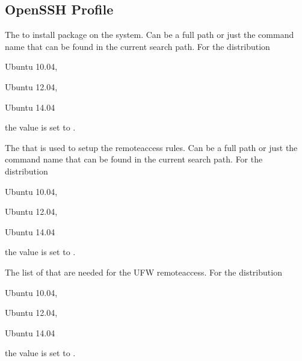 \label{sec:remoteaccess_profile}
\subsection{OpenSSH Profile}


The  to install package on the system. Can be a full path or
just the command name that can be found in the current search path. 
For the distribution
\begin{inparaitem}
\item[\TheDistribution{ubuntu}] Ubuntu 10.04,
\item[\TheDistribution{ubuntu}] Ubuntu 12.04,
\item[\TheDistribution{ubuntu}] Ubuntu 14.04
\end{inparaitem}
the value is set to .


The  that is used to setup the remoteaccess rules. Can be a full path or
just the command name that can be found in the current search path. 
For the distribution
\begin{inparaitem}
\item[\TheDistribution{ubuntu}] Ubuntu 10.04,
\item[\TheDistribution{ubuntu}] Ubuntu 12.04,
\item[\TheDistribution{ubuntu}] Ubuntu 14.04
\end{inparaitem}
the value is set to .


The list of  that are needed for the UFW remoteaccess. 
For the distribution
\begin{inparaitem}
\item[\TheDistribution{ubuntu}] Ubuntu 10.04,
\item[\TheDistribution{ubuntu}] Ubuntu 12.04,
\item[\TheDistribution{ubuntu}] Ubuntu 14.04
\end{inparaitem}
the value is set to .

